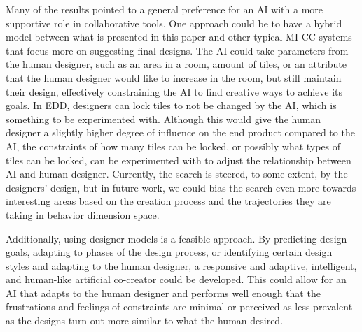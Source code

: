 

Many of the results pointed to a general preference for an AI with a more supportive role in collaborative tools. One approach could be to have a hybrid model between what is presented in this paper and other typical MI-CC systems that focus more on suggesting final designs. The AI could take parameters from the human designer, such as an area in a room, amount of tiles, or an attribute that the human designer would like to increase in the room, but still maintain their design, effectively constraining the AI to find creative ways to achieve its goals. In EDD, designers can lock tiles to not be changed by the AI, which is something to be experimented with. Although this would give the human designer a slightly higher degree of influence on the end product compared to the AI, the constraints of how many tiles can be locked, or possibly what types of tiles can be locked, can be experimented with to adjust the relationship between AI and human designer. Currently, the search is steered, to some extent, by the designers' design, but in future work, we could bias the search even more towards interesting areas based on the creation process and the trajectories they are taking in behavior dimension space. 

Additionally, using designer models is a feasible approach. By predicting design goals, adapting to phases of the design process, or identifying certain design styles and adapting to the human designer, a responsive and adaptive, intelligent, and human-like artificial co-creator could be developed. This could allow for an AI that adapts to the human designer and performs well enough that the frustrations and feelings of constraints are minimal or perceived as less prevalent as the designs turn out more similar to what the human desired.


